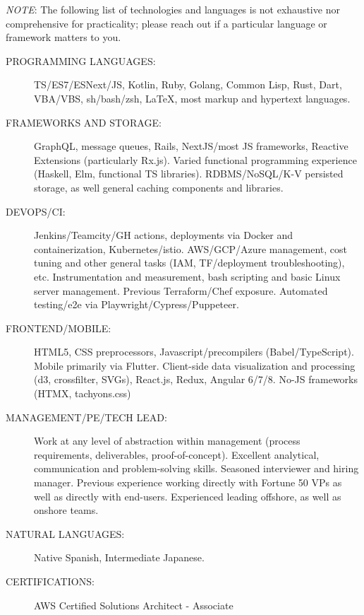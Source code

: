 \documentclass[letterpaper,11pt]{article}
\begin{document}
\vspace{2pt}
\textit{NOTE}: The following list of technologies and languages is not exhaustive nor comprehensive for practicality; please reach out if a particular language or framework matters to you.
\begin{description}
	\item[PROGRAMMING LANGUAGES:]
    TS/ES7/ESNext/JS, Kotlin, Ruby, Golang, Common Lisp, Rust, Dart, VBA/VBS, sh/bash/zsh, \LaTeX, most markup and hypertext languages. 

	\item[FRAMEWORKS AND STORAGE:]
    GraphQL, message queues, Rails, NextJS/most JS frameworks, Reactive Extensions (particularly Rx.js). Varied functional programming experience (Haskell, Elm, functional TS libraries). RDBMS/NoSQL/K-V persisted storage, as well general caching components and libraries.

	\item [DEVOPS/CI:]
    Jenkins/Teamcity/GH actions, deployments via Docker and containerization, Kubernetes/istio. AWS/GCP/Azure management, cost tuning and other general tasks (IAM, TF/deployment troubleshooting), etc. Instrumentation and measurement, bash scripting and basic Linux server management. Previous Terraform/Chef exposure. Automated testing/e2e via Playwright/Cypress/Puppeteer.

  \item [FRONTEND/MOBILE:]
    HTML5, CSS preprocessors, Javascript/precompilers (Babel/TypeScript). Mobile primarily via Flutter. Client-side data visualization and processing (d3, crossfilter, SVGs), React.js, Redux, Angular 6/7/8. No-JS frameworks (HTMX, tachyons.css)

	\item[MANAGEMENT/PE/TECH LEAD:]
    Work at any level of abstraction within management (process requirements, deliverables, proof-of-concept). Excellent analytical, communication and problem-solving skills. Seasoned interviewer and hiring manager. Previous experience working directly with Fortune 50 VPs as well as directly with end-users. Experienced leading offshore, as well as onshore teams.

	\item[NATURAL LANGUAGES:]
		Native Spanish, Intermediate Japanese.

	\item[CERTIFICATIONS:]
		AWS Certified Solutions Architect - Associate

\end{description}
\end{document}
